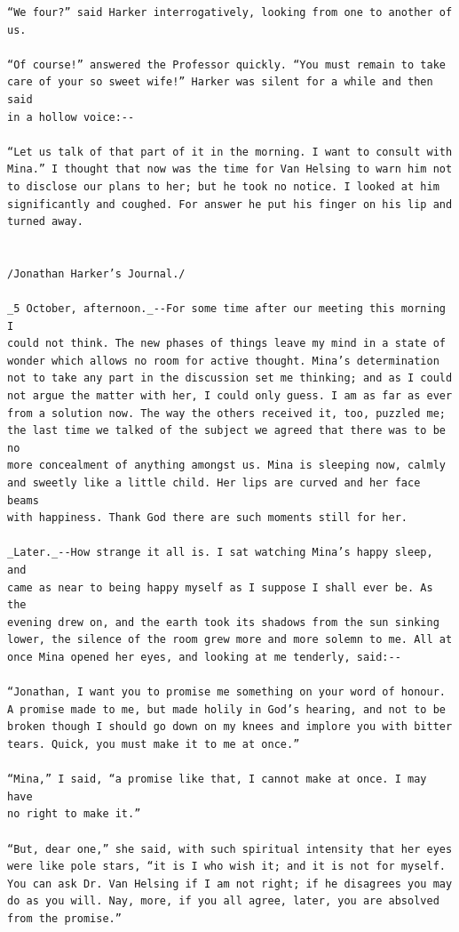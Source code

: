 \documentclass{article}
\begin{document}
\begin{verbatim}
“We four?” said Harker interrogatively, looking from one to another of
us.

“Of course!” answered the Professor quickly. “You must remain to take
care of your so sweet wife!” Harker was silent for a while and then said
in a hollow voice:--

“Let us talk of that part of it in the morning. I want to consult with
Mina.” I thought that now was the time for Van Helsing to warn him not
to disclose our plans to her; but he took no notice. I looked at him
significantly and coughed. For answer he put his finger on his lip and
turned away.


/Jonathan Harker’s Journal./

_5 October, afternoon._--For some time after our meeting this morning I
could not think. The new phases of things leave my mind in a state of
wonder which allows no room for active thought. Mina’s determination
not to take any part in the discussion set me thinking; and as I could
not argue the matter with her, I could only guess. I am as far as ever
from a solution now. The way the others received it, too, puzzled me;
the last time we talked of the subject we agreed that there was to be no
more concealment of anything amongst us. Mina is sleeping now, calmly
and sweetly like a little child. Her lips are curved and her face beams
with happiness. Thank God there are such moments still for her.

_Later._--How strange it all is. I sat watching Mina’s happy sleep, and
came as near to being happy myself as I suppose I shall ever be. As the
evening drew on, and the earth took its shadows from the sun sinking
lower, the silence of the room grew more and more solemn to me. All at
once Mina opened her eyes, and looking at me tenderly, said:--

“Jonathan, I want you to promise me something on your word of honour.
A promise made to me, but made holily in God’s hearing, and not to be
broken though I should go down on my knees and implore you with bitter
tears. Quick, you must make it to me at once.”

“Mina,” I said, “a promise like that, I cannot make at once. I may have
no right to make it.”

“But, dear one,” she said, with such spiritual intensity that her eyes
were like pole stars, “it is I who wish it; and it is not for myself.
You can ask Dr. Van Helsing if I am not right; if he disagrees you may
do as you will. Nay, more, if you all agree, later, you are absolved
from the promise.”


\end{verbatim}
\end{document}
